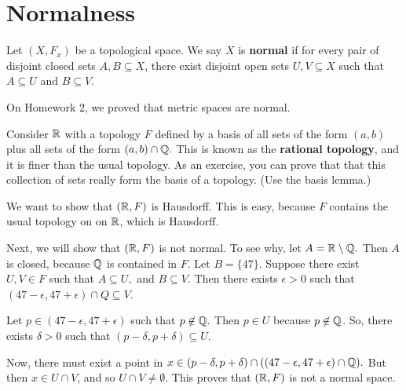 

\section{Normalness} 
\begin{definition}
	Let $(X,F_x)$ be a topological space. We say $X$ is \textbf{normal} if for every pair of disjoint closed sets $A,B \subseteq X$, there exist disjoint open sets $U,V\subseteq X$ such that $A \subseteq U$ and $B \subseteq V$. 
\end{definition}

On Homework 2, we proved that metric spaces are normal. 
\begin{example}
	Consider $\mathbb R$ with a topology $F$ defined by a basis of all sets of the form $(a,b)$ plus all sets of the form $(a,b)\cap \mathbb Q.$ This is known as the \textbf{rational topology}, and it is finer than the usual topology. As an exercise, you can prove that that this collection of sets really form the basis of a topology. (Use the basis lemma.) 
	
	We want to show that $(\mathbb R,F)$ is Hausdorff. This is easy, because $F$ contains the usual topology on on $\mathbb R$, which is Hausdorff. 
	
	Next, we will show that $(\mathbb R,F)$ is not normal. To see why, let $A=\mathbb R\setminus\mathbb Q.$ Then $A$ is closed, because $\mathbb Q$ is contained in $F$. Let $B=\{47\}.$ Suppose there exist $U,V \in F$ such that $A \subseteq U,$ and $B \subseteq V$. Then there exists $\epsilon>0$ such that $(47-\epsilon,47+\epsilon)\cap Q \subseteq V$. 
	
	Let $p \in (47-\epsilon,47+\epsilon)$ such that $p \not\in \mathbb Q.$ Then $p \in U$ because $p \not\in \mathbb Q$. So, there exists $\delta>0$ such that $(p-\delta,p+\delta) \subseteq U$. 
	
	Now, there must exist a point in $x \in (p-\delta,p+\delta)\cap((47-\epsilon,47+\epsilon) \cap \mathbb Q).$ But then $x \in U \cap V$, and so $U \cap V \neq \emptyset$. This proves that $(\mathbb R,F)$ is not a normal space. 
\end{example}

